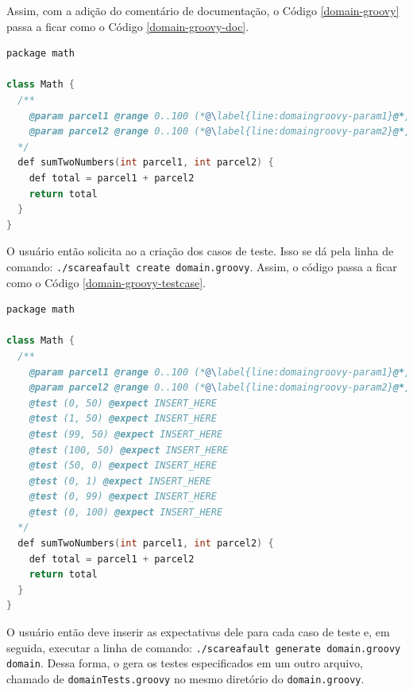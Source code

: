 Assim, com a adição do comentário de documentação, o Código \ref{domain-groovy}
passa a ficar como o Código \ref{domain-groovy-doc}.
\begin{lstlisting}[language=C++, label=domain-groovy-doc, caption=Código do arquivo domain.groovy com as marcações do \scarefault]
package math

class Math {
  /**
    @param parcel1 @range 0..100 (*@\label{line:domaingroovy-param1}@*)
    @param parcel2 @range 0..100 (*@\label{line:domaingroovy-param2}@*)
  */
  def sumTwoNumbers(int parcel1, int parcel2) {
    def total = parcel1 + parcel2
    return total
  }
}
\end{lstlisting}

O usuário então solicita ao \scarefault a criação dos casos de teste.
Isso se dá pela linha de comando:
\lstinline|./scareafault create domain.groovy|. Assim,
o código passa a ficar como o Código \ref{domain-groovy-testcase}.
\begin{lstlisting}[language=C++, label=domain-groovy-testcase, caption=Código do arquivo domain.groovy com os casos de teste]
package math

class Math {
  /**
    @param parcel1 @range 0..100 (*@\label{line:domaingroovy-param1}@*)
    @param parcel2 @range 0..100 (*@\label{line:domaingroovy-param2}@*)
    @test (0, 50) @expect INSERT_HERE
    @test (1, 50) @expect INSERT_HERE
    @test (99, 50) @expect INSERT_HERE
    @test (100, 50) @expect INSERT_HERE
    @test (50, 0) @expect INSERT_HERE
    @test (0, 1) @expect INSERT_HERE
    @test (0, 99) @expect INSERT_HERE
    @test (0, 100) @expect INSERT_HERE
  */
  def sumTwoNumbers(int parcel1, int parcel2) {
    def total = parcel1 + parcel2
    return total
  }
}
\end{lstlisting}

O usuário então deve inserir as expectativas dele para cada caso
de teste e, em seguida, executar a linha de comando:
\lstinline|./scareafault generate domain.groovy domain|.
Dessa forma, o \scarefault gera os testes especificados em um outro
arquivo, chamado de \lstinline|domainTests.groovy| no mesmo diretório
do \lstinline|domain.groovy|.
